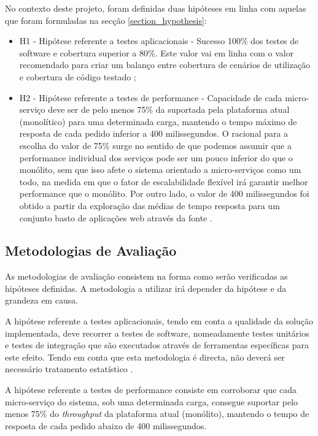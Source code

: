 No contexto deste projeto, foram definidas duas hipóteses em linha com aquelas que foram formuladas na secção \ref{section_hypothesis}:
\begin{itemize}
    \item H1 - Hipótese referente a testes aplicacionais - Sucesso 100\% dos testes de software e cobertura superior a 80\%. Este valor vai em linha com o valor recomendado para criar um balanço entre cobertura de cenários de utilização e cobertura de código testado \cite{code_coverage};
    \item H2 - Hipótese referente a testes de performance - Capacidade de cada micro-serviço deve ser de pelo menos 75\% da suportada pela plataforma atual (monolítico) para uma determinada carga, mantendo o tempo máximo de resposta de cada pedido inferior a 400 milissegundos.
    O racional para a escolha do valor de 75\% surge no sentido de que podemos assumir que a performance individual dos serviços pode ser um pouco inferior do que o monólito, sem que isso afete o sistema orientado a micro-serviços como um todo, na medida em que o fator de escalabilidade flexível irá garantir melhor performance que o monólito.
    Por outro lado, o valor de 400 milissegundos foi obtido a partir da exploração das médias de tempo resposta para um conjunto basto de aplicações web através da fonte \cite{average_server_response_time}.
\end{itemize}

\subsection{Metodologias de Avaliação}
As metodologias de avaliação consistem na forma como serão verificadas as hipóteses definidas. A metodologia a utilizar irá depender da hipótese e da grandeza em causa.

A hipótese referente a testes aplicacionais, tendo em conta a qualidade da solução implementada, deve recorrer a testes de software, nomeadamente testes unitários e testes de integração que são executados através de ferramentas específicas para este efeito. Tendo em conta que esta metodologia é directa, não deverá ser necessário tratamento estatístico \cite{software_testing_2}.

A hipótese referente a testes de performance consiste em corroborar que cada micro-serviço do sistema, sob uma determinada carga, consegue suportar pelo menos 75\% do \emph{throughput} da plataforma atual (monólito), mantendo o tempo de resposta de cada pedido abaixo de 400 milissegundos.


